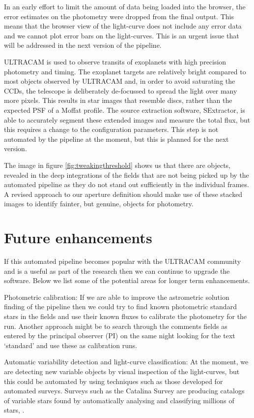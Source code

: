 In an early effort to limit the amount of data being loaded into the browser, the error estimates on the photometry were dropped from the final output. This means that the browser view of the light-curve does not include any error data and we cannot plot error bars on the light-curves. This is an urgent issue that will be addressed in the next version of the pipeline. 

ULTRACAM is used to observe transits of exoplanets with high precision photometry and timing. The exoplanet targets are relatively bright compared to most objects observed by ULTRACAM and, in order to avoid saturating the CCDs, the telescope is deliberately de-focussed to spread the light over many more pixels. This results in star images that resemble discs, rather than the expected PSF of a Moffat profile. The source extraction software, SExtractor, is able to accurately segment these extended images and measure the total flux, but this requires a change to the configuration parameters. This step is not automated by the pipeline at the moment, but this is planned for the next version. 

The image in figure \ref{fig:tweakingthreshold} shows us that there are objects, revealed in the deep integrations of the fields that are not being picked up by the automated pipeline as they do not stand out sufficiently in the individual frames. A revised approach to our aperture definition should make use of these stacked images to identify fainter, but genuine, objects for photometry. 

\section{Future enhancements}
If this automated pipeline becomes popular with the ULTRACAM community and is a useful as part of the research then we can continue to upgrade the software. Below we list some of the potential areas for longer term enhancements.

{Photometric calibration}: If we are able to improve the astrometric solution finding of the pipeline then we could try to find known photometric standard stars in the fields and use their known fluxes to calibrate the photometry for the run. Another approach might be to search through the comments fields as entered by the principal observer (PI) on the same night looking for the text `standard' and use these as calibration runs. 

{Automatic variability detection and light-curve classification}: At the moment, we are detecting new variable objects by visual inspection of the light-curves, but this could be automated by using techniques such as those developed for automated surveys. Surveys such as the Catalina Survey are producing catalogs of variable stars found by automatically analysing and classifying millions of stars, \citep{CatalinaCatalog}.

